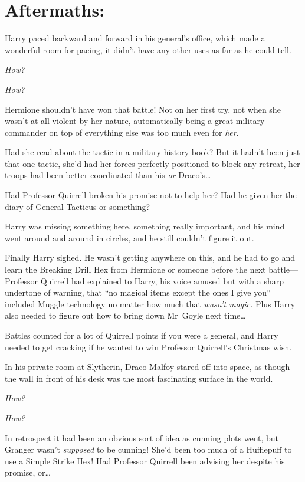 
\section{Aftermaths:}

Harry paced backward and forward in his general’s office, which made a wonderful room for pacing, it didn’t have any other uses as far as he could tell.

\emph{How?}

\emph{How?}

Hermione shouldn’t have won that battle! Not on her first try, not when she wasn’t at all violent by her nature, automatically being a great military commander on top of everything else was too much even for \emph{her}.

Had she read about the tactic in a military history book? But it hadn’t been just that one tactic, she’d had her forces perfectly positioned to block any retreat, her troops had been better coordinated than his \emph{or} Draco’s…

Had Professor Quirrell broken his promise not to help her? Had he given her the diary of General Tacticus or something?

Harry was missing something here, something really important, and his mind went around and around in circles, and he still couldn’t figure it out.

Finally Harry sighed. He wasn’t getting anywhere on this, and he had to go and learn the Breaking Drill Hex from Hermione or someone before the next battle—Professor Quirrell had explained to Harry, his voice amused but with a sharp undertone of warning, that “no magical items except the ones I give you” included Muggle technology no matter how much that \emph{wasn’t magic.} Plus Harry also needed to figure out how to bring down Mr~Goyle next time…

Battles counted for a lot of Quirrell points if you were a general, and Harry needed to get cracking if he wanted to win Professor Quirrell’s Christmas wish.

\later

In his private room at Slytherin, Draco Malfoy stared off into space, as though the wall in front of his desk was the most fascinating surface in the world.

\emph{How?}

\emph{How?}

In retrospect it had been an obvious sort of idea as cunning plots went, but Granger wasn’t \emph{supposed} to be cunning! She’d been too much of a Hufflepuff to use a Simple Strike Hex! Had Professor Quirrell been advising her despite his promise, or…

